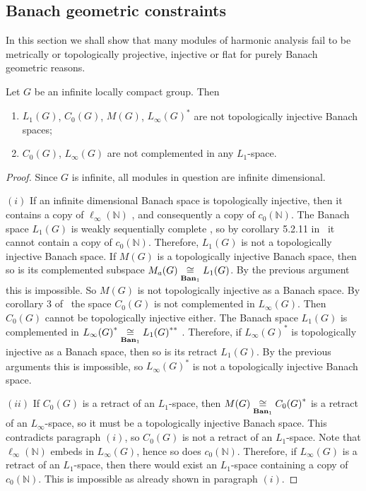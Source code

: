 \subsection{
    Banach geometric constraints}\label{
SubSectionBanachGeometricConstraints}

In this section we shall show that many modules of harmonic analysis fail to
be metrically or topologically projective, injective or flat for purely Banach
geometric reasons. 

\begin{proposition}\label{StdModAreNotRetrOfL1LInf} Let $G$ be an infinite
locally compact group. Then

\begin{enumerate}[label = (\roman*)]
    \item $L_1(G)$, $C_0(G)$, $M(G)$, ${L_\infty(G)}^*$ are not 
    topologically injective Banach spaces;

    \item $C_0(G)$, $L_\infty(G)$ are not complemented in any $L_1$-space.
\end{enumerate}
\end{proposition}
\begin{proof}
Since $G$ is infinite, all modules in question are infinite dimensional.

$(i)$ If an infinite dimensional Banach space is topologically injective, then it
contains a copy of $\ell_\infty(\mathbb{N})$ \cite[corollary 1.1.4]{RosOnRelDisjFamOfMeas}, and consequently a copy of $c_0(\mathbb{N})$. The Banach space
$L_1(G)$ is weakly sequentially complete \cite[corollary III.C.14]{WojBanSpForAnalysts}, so by corollary 5.2.11 in~\cite{KalAlbTopicsBanSpTh} it cannot contain
a copy of $c_0(\mathbb{N})$. Therefore, $L_1(G)$ is not a topologically injective
Banach space.  If $M(G)$ is a topologically injective Banach space, then so is
its complemented subspace $M_a(G)\mathrel{\mathop{\cong}\limits_{\mathbf{Ban}_1}}L_1(G)$. By the previous
argument this is impossible. So $M(G)$ is not topologically injective as a Banach
space. By corollary 3 of~\cite{LauMingComplSubspInLInfOfG} the space $C_0(G)$ is
not complemented in $L_\infty(G)$. Then $C_0(G)$ cannot be topologically
injective either. The Banach space $L_1(G)$ is complemented in
${L_\infty(G)}^*\mathrel{\mathop{\cong}\limits_{\mathbf{Ban}_1}}{L_1(G)}^{**}$ \cite[proposition B10]{DefFloTensNorOpId}. Therefore, if ${L_\infty(G)}^*$ is topologically injective as a
Banach space, then so is its retract $L_1(G)$. By the previous arguments this is
impossible, so ${L_\infty(G)}^*$ is not a topologically injective Banach space.

$(ii)$ If $C_0(G)$ is a retract of an $L_1$-space, then
$M(G)\mathrel{\mathop{\cong}\limits_{\mathbf{Ban}_1}}{C_0(G)}^*$ is a retract of an $L_\infty$-space, 
so it must be a topologically injective Banach space. This contradicts 
paragraph $(i)$, so $C_0(G)$ is not a retract of an $L_1$-space. 
Note that $\ell_\infty(\mathbb{N})$ embeds in $L_\infty(G)$, hence so 
does $c_0(\mathbb{N})$. Therefore, if $L_\infty(G)$ is
a retract of an $L_1$-space, then there would exist an $L_1$-space containing a
copy of $c_0(\mathbb{N})$. This is impossible as already shown in paragraph
$(i)$.
\end{proof}

